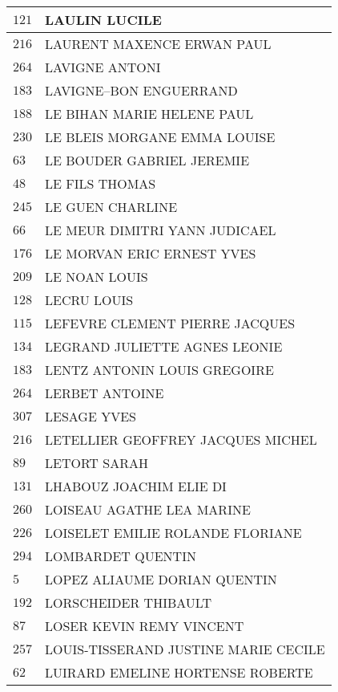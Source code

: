 \begin{xltabular}{\linewidth}{|l|X|}
    \hline
    $121$ & LAULIN LUCILE \\
    \hline
    $216$ & LAURENT MAXENCE ERWAN PAUL \\
    \hline
    $264$ & LAVIGNE ANTONI \\
    \hline
    $183$ & LAVIGNE--BON ENGUERRAND \\
    \hline
    $188$ & LE BIHAN MARIE HELENE PAUL \\
    \hline
    $230$ & LE BLEIS MORGANE EMMA LOUISE \\
    \hline
    $63$ & LE BOUDER GABRIEL JEREMIE \\
    \hline
    $48$ & LE FILS THOMAS \\
    \hline
    $245$ & LE GUEN CHARLINE \\
    \hline
    $66$ & LE MEUR DIMITRI YANN JUDICAEL \\
    \hline
    $176$ & LE MORVAN ERIC ERNEST YVES \\
    \hline
    $209$ & LE NOAN LOUIS \\
    \hline
    $128$ & LECRU LOUIS \\
    \hline
    $115$ & LEFEVRE CLEMENT PIERRE JACQUES \\
    \hline
    $134$ & LEGRAND JULIETTE AGNES LEONIE \\
    \hline
    $183$ & LENTZ ANTONIN LOUIS GREGOIRE \\
    \hline
    $264$ & LERBET ANTOINE \\
    \hline
    $307$ & LESAGE YVES \\
    \hline
    $216$ & LETELLIER GEOFFREY JACQUES MICHEL \\
    \hline
    $89$ & LETORT SARAH \\
    \hline
    $131$ & LHABOUZ JOACHIM ELIE DI \\
    \hline
    $260$ & LOISEAU AGATHE LEA MARINE \\
    \hline
    $226$ & LOISELET EMILIE ROLANDE FLORIANE \\
    \hline
    $294$ & LOMBARDET QUENTIN \\
    \hline
    $5$ & LOPEZ ALIAUME DORIAN QUENTIN \\
    \hline
    $192$ & LORSCHEIDER THIBAULT \\
    \hline
    $87$ & LOSER KEVIN REMY VINCENT \\
    \hline
    $257$ & LOUIS-TISSERAND JUSTINE MARIE CECILE \\
    \hline
    $62$ & LUIRARD EMELINE HORTENSE ROBERTE \\
    \hline

\end{xltabular}
